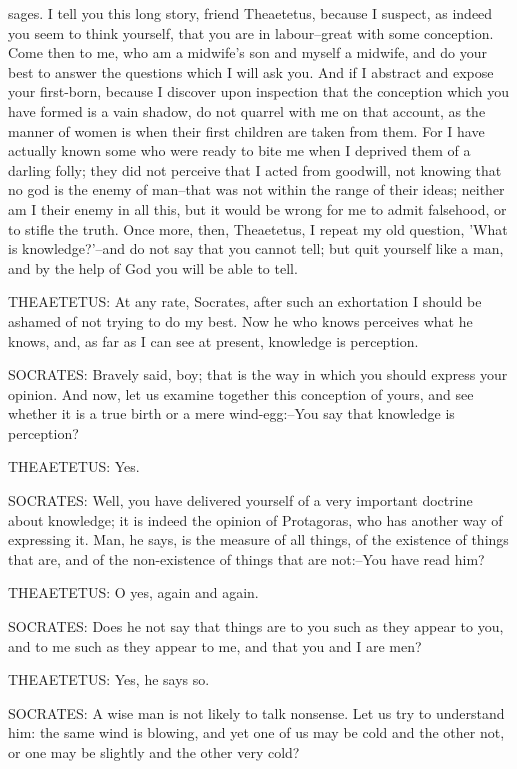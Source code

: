sages. I tell you this long story, friend Theaetetus, because I suspect,
as indeed you seem to think yourself, that you are in labour--great with
some conception. Come then to me, who am a midwife's son and myself a
midwife, and do your best to answer the questions which I will ask you.
And if I abstract and expose your first-born, because I discover upon
inspection that the conception which you have formed is a vain shadow,
do not quarrel with me on that account, as the manner of women is when
their first children are taken from them. For I have actually known some
who were ready to bite me when I deprived them of a darling folly; they
did not perceive that I acted from goodwill, not knowing that no god is
the enemy of man--that was not within the range of their ideas; neither
am I their enemy in all this, but it would be wrong for me to admit
falsehood, or to stifle the truth. Once more, then, Theaetetus, I repeat
my old question, 'What is knowledge?'--and do not say that you cannot
tell; but quit yourself like a man, and by the help of God you will be
able to tell.

THEAETETUS: At any rate, Socrates, after such an exhortation I should be
ashamed of not trying to do my best. Now he who knows perceives what he
knows, and, as far as I can see at present, knowledge is perception.

SOCRATES: Bravely said, boy; that is the way in which you should express
your opinion. And now, let us examine together this conception of yours,
and see whether it is a true birth or a mere wind-egg:--You say that
knowledge is perception?

THEAETETUS: Yes.

SOCRATES: Well, you have delivered yourself of a very important doctrine
about knowledge; it is indeed the opinion of Protagoras, who has another
way of expressing it. Man, he says, is the measure of all things, of the
existence of things that are, and of the non-existence of things that
are not:--You have read him?

THEAETETUS: O yes, again and again.

SOCRATES: Does he not say that things are to you such as they appear to
you, and to me such as they appear to me, and that you and I are men?

THEAETETUS: Yes, he says so.

SOCRATES: A wise man is not likely to talk nonsense. Let us try to
understand him: the same wind is blowing, and yet one of us may be cold
and the other not, or one may be slightly and the other very cold?

